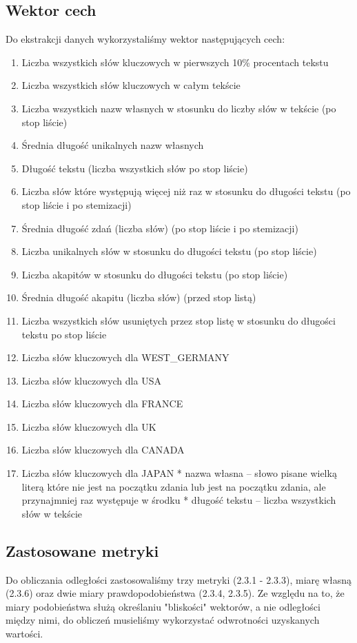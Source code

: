 \documentclass{classrep}
\begin{document}
\subsection{Wektor cech}
Do ekstrakcji danych wykorzystaliśmy wektor następujących cech:
\begin{enumerate}
  \item Liczba wszystkich słów kluczowych w pierwszych 10\% procentach tekstu
  \item Liczba wszystkich słów kluczowych w całym tekście
  \item Liczba wszystkich nazw własnych w stosunku do liczby słów w tekście (po stop liście)
  \item Średnia długość unikalnych nazw własnych 
  \item Długość tekstu (liczba wszystkich słów po stop liście)
  \item Liczba słów które występują więcej niż raz w stosunku do długości tekstu (po stop liście i po stemizacji)
  \item Średnia długość zdań (liczba słów) (po stop liście i  po stemizacji)
  \item Liczba unikalnych słów w stosunku do długości tekstu (po stop liście)
  \item Liczba akapitów w stosunku do długości tekstu (po stop liście)
  \item Średnia długość akapitu (liczba słów) (przed stop listą)
  \item Liczba wszystkich słów usuniętych przez stop listę w stosunku do długości tekstu po stop liście
  \item Liczba słów kluczowych dla WEST\_GERMANY
  \item Liczba słów kluczowych dla USA
  \item Liczba słów kluczowych dla FRANCE
  \item Liczba słów kluczowych dla UK
  \item Liczba słów kluczowych dla CANADA
  \item Liczba słów kluczowych dla JAPAN
  \newline
  \newline
  * nazwa własna – słowo pisane wielką literą które nie jest na początku zdania lub jest na początku zdania, ale przynajmniej raz występuje w środku\newline
* długość tekstu – liczba wszystkich słów w tekście
\end{enumerate}

\subsection{Zastosowane metryki}
Do obliczania odległości zastosowaliśmy trzy metryki (2.3.1 - 2.3.3), miarę własną (2.3.6) oraz dwie miary prawdopodobieństwa (2.3.4, 2.3.5). Ze względu na to, że miary podobieństwa służą określaniu "bliskości" wektorów, a nie odległości między nimi, do obliczeń musieliśmy wykorzystać odwrotności uzyskanych wartości. 
\end{document}
